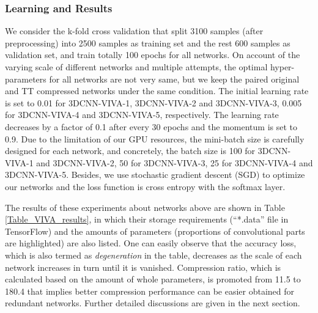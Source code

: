 \documentclass[a4paper,fleqn]{cas-dc}
\begin{document}
\subsubsection{Learning and Results}\quad

We consider the k-fold cross validation that split 3100 samples (after preprocessing) into 2500 samples as training set and the rest 600 samples as validation set, and train totally 100 epochs for all networks. On account of the varying scale of different networks and multiple attempts, the optimal hyper-parameters for all networks are not very same, but we keep the paired original and TT compressed networks under the same condition. The initial learning rate is set to 0.01 for 3DCNN-VIVA-1, 3DCNN-VIVA-2 and 3DCNN-VIVA-3, 0.005 for 3DCNN-VIVA-4 and 3DCNN-VIVA-5, respectively. The learning rate decreases by a factor of 0.1 after every 30 epochs and the momentum is set to 0.9. Due to the limitation of our GPU resources, the mini-batch size is carefully designed for each network, and concretely, the batch size is 100 for 3DCNN-VIVA-1 and 3DCNN-VIVA-2, 50 for 3DCNN-VIVA-3, 25 for 3DCNN-VIVA-4 and 3DCNN-VIVA-5. Besides, we use stochastic gradient descent (SGD) to optimize our networks and the loss function is cross entropy with the softmax layer.

The results of these experiments about networks above are shown in Table \ref{Table_VIVA_results}, in which their storage requirements (``*.data'' file in TensorFlow) and the amounts of parameters (proportions of convolutional parts are highlighted) are also listed. One can easily observe that the accuracy loss, which is also termed as \emph{degeneration} in the table, decreases as the scale of each network increases in turn until it is vanished. Compression ratio, which is calculated based on the amount of whole parameters, is promoted from 11.5 to 180.4 that implies better compression performance can be easier obtained for redundant networks. Further detailed discussions are given in the next section.
\end{document}
